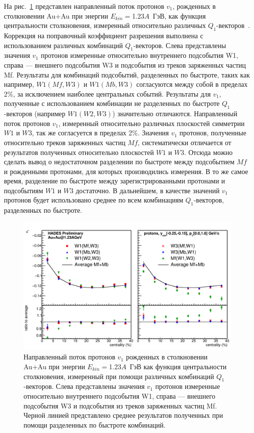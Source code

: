 На рис.~\ref{fig:hades_w1w3} представлен направленный поток протонов $v_1$, рожденных в столкновении Au+Au при энергии $E_{kin}=$1.23$A$~ГэВ, как функция центральности столкновения, измеренный относительно различных $Q_1$-векторов~\cite{Mamaev:2020qom}. 
Коррекция на поправочный коэффициент разрешения выполнена с использованием различных комбинаций $Q_1$-векторов.
Слева представлены значения $v_1$ протонов измеренные относительно внутреннего подсобытия W1, справа --- внешнего подсобытия W3 и подсобытия из треков заряженных частиц Mf. 
Результаты для комбинаций подсобытий, разделенных по быстроте, таких как например, $W1(Mf,W3)$ и $W1(Mb,W3)$ согласуются между собой в пределах 2\%, за исключением наиболее центральных событий. 
Результаты для $v_1$, полученные с использованием комбинации не разделенных по быстроте $Q_1$-векторов (например $W1(W2,W3)$) значительно отличаются.
Направленный поток протонов $v_1$, измеренный относительно различных плоскостей симметрии $W1$ и $W3$, так же согласуется в пределах 2\%.
Значения $v_1$ протонов, полученные относительно треков заряженных частиц $Mf$, систематически отличается от результатов полученных относительно плоскостей $W1$ и $W3$. 
Отсюда можно сделать вывод о недостаточном разделении по быстроте между подсобытием $Mf$ и рожденными протонами, для которых производились измерения.
В то же самое время, разделение по быстроте между зарегистрированными протонами и подсобытиям $W1$ и $W3$ достаточно.
В дальнейшем, в качестве значений $v_1$ протонов будет использовано среднее по всем комбинациям $Q_1$-векторов, разделенных по быстроте.
%
\begin{figure}[ht]
\begin{center}
\includegraphics[width=0.75\linewidth]{images/W1AndW3Nucleus.png}
\caption{Направленный поток протонов $v_1$ рожденных в столкновении Au+Au при энергии $E_{kin}=$1.23$A$~ГэВ как функция центральности столкновения, измеренный при помощи различных комбинаций $Q_1$-векторов. Слева представлены значения $v_1$ протонов измеренные относительно внутреннего подсобытия W1, справа --- внешнего подсобытия W3 и подсобытия из треков заряженных частиц Mf. Черной линией представлено среднее результатов полученных при помощи разделенных по быстроте комбинаций.}
\label{fig:hades_w1w3}
\end{center}
\end{figure}

